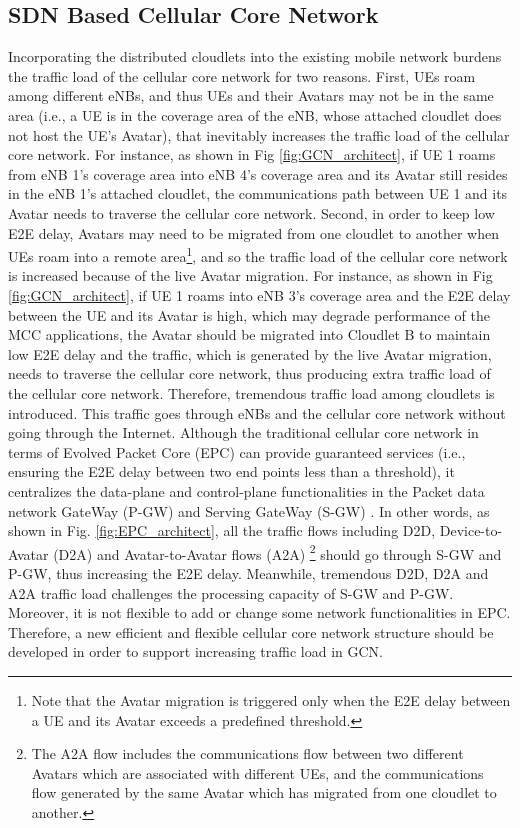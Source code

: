 \documentclass[journal,12pt,draftclsnofoot,onecolumn]{IEEEtran}
\begin{document}
\subsection{SDN Based Cellular Core Network}
Incorporating the distributed cloudlets into the existing mobile network burdens the traffic load of the cellular core network for two reasons. First, UEs roam among different eNBs, and thus UEs and their Avatars may not be in the same area (i.e., a UE is in the coverage area of the eNB, whose attached cloudlet does not host the UE's Avatar), that inevitably increases the traffic load of the cellular core network. For instance, as shown in Fig \ref{fig:GCN_architect}, if UE 1 roams from eNB 1's coverage area into eNB 4's coverage area and its Avatar still resides in the eNB 1's attached cloudlet, the communications path between UE 1 and its Avatar needs to traverse the cellular core network. Second, in order to keep low E2E delay, Avatars may need to be migrated from one cloudlet to another when UEs roam into a remote area\footnote{Note that the Avatar migration is triggered only when the E2E delay between a UE and its Avatar exceeds a predefined threshold.}, and so the traffic load of the cellular core network is increased because of the live Avatar migration. For instance, as shown in Fig \ref{fig:GCN_architect}, if UE 1 roams into eNB 3's coverage area and the E2E delay between the UE and its Avatar is high, which may degrade performance of the MCC applications, the Avatar should be migrated into Cloudlet B to maintain low E2E delay and the traffic, which is generated by the live Avatar migration, needs to traverse the cellular core network, thus producing extra traffic load of the cellular core network. Therefore, tremendous traffic load among cloudlets is introduced. This traffic goes through eNBs and the cellular core network without going through the Internet. Although the traditional cellular core network in terms of Evolved Packet Core (EPC) can provide guaranteed services (i.e., ensuring the E2E delay between two end points less than a threshold), it centralizes the data-plane and control-plane functionalities in the Packet data network GateWay (P-GW) and Serving GateWay (S-GW) \cite{7}. In other words, as shown in Fig. \ref{fig:EPC_architect}, all the traffic flows including D2D, Device-to-Avatar (D2A) and Avatar-to-Avatar flows (A2A) \footnote{The A2A flow includes the communications flow between two different Avatars which are associated with different UEs, and the communications flow generated by the same Avatar which has migrated from one cloudlet to another.} should go through S-GW and P-GW, thus increasing the E2E delay. Meanwhile, tremendous D2D, D2A and A2A traffic load challenges the processing capacity of S-GW and P-GW. Moreover, it is not flexible to add or change some network functionalities in EPC. Therefore, a new efficient and flexible cellular core network structure should be developed in order to support increasing traffic load in GCN.
\end{document}
